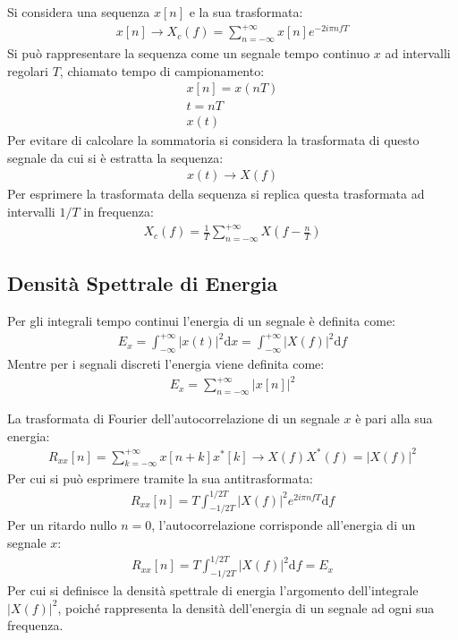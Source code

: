 \documentclass{article}
\newcommand{\df}{\mathrm{d}}
\numberwithin{equation}{subsection}
\begin{document}
Si considera una sequenza $x[n]$ e la sua trasformata:
\begin{gather*}
    x[n]\to X_c(f)=\displaystyle\sum_{n=-\infty}^{+\infty}x[n]e^{-2i\pi nfT}
\end{gather*}
Si può rappresentare la sequenza come un segnale tempo continuo $x$ ad intervalli regolari $T$, chiamato tempo di campionamento:
\begin{gather*}
    x[n]=x(nT)\\
    t=nT\\
    x(t)
\end{gather*}
Per evitare di calcolare la sommatoria si considera la trasformata di questo segnale da cui si è estratta la sequenza: 
\begin{gather*}
    x(t)\to X(f)
\end{gather*}
Per esprimere la trasformata della sequenza si replica questa trasformata ad intervalli $1/T$ in frequenza:
\begin{gather*}
    X_c(f)=\displaystyle\frac{1}{T}\sum_{n=-\infty}^{+\infty}X\left(f-\frac{n}{T}\right)
\end{gather*}

\subsection{Densità Spettrale di Energia}

Per gli integrali tempo continui l'energia di un segnale è definita come:
\begin{gather*}
    E_x=\displaystyle\int_{-\infty}^{+\infty}|x(t)|^2\df x=\int_{-\infty}^{+\infty}|X(f)|^2\df f
\end{gather*}
Mentre per i segnali discreti l'energia viene definita come:
\begin{gather*}
    E_x=\displaystyle\sum_{n=-\infty}^{+\infty}|x[n]|^2
\end{gather*}

La trasformata di Fourier dell'autocorrelazione di un segnale $x$ è pari alla sua energia:
\begin{gather*}
    R_{xx}[n]=\displaystyle\sum_{k=-\infty}^{+\infty}x[n+k]x^*[k]\to X(f)X^*(f)=|X(f)|^2
\end{gather*}
Per cui si può esprimere tramite la sua antitrasformata:
\begin{gather*}
    R_{xx}[n]=T\displaystyle\int_{-1/2T}^{1/2T}|X(f)|^2e^{2i\pi nfT}\df f
\end{gather*}
Per un ritardo nullo $n=0$, l'autocorrelazione corrisponde all'energia di un segnale $x$:
\begin{gather*}
    R_{xx}[n]=T\displaystyle\int_{-1/2T}^{1/2T}|X(f)|^2\df f=E_x
\end{gather*}
Per cui si definisce la densità spettrale di energia l'argomento dell'integrale $|X(f)|^2$, poiché rappresenta la densità dell'energia di un segnale 
ad ogni sua frequenza. 
\end{document}

